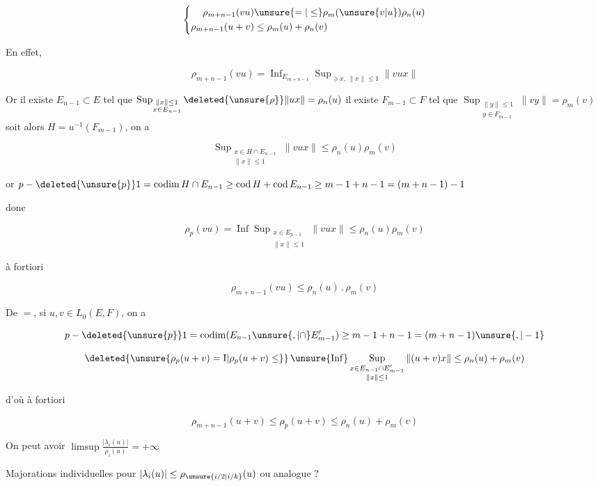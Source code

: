 
\[
\left\{\begin{aligned}
\rho_{m+n-1}(vu)&\unsure{=|\leq}\rho_m(\unsure{v|u})\rho_n(u)\\
\rho_{m+n-1}(u+v)&\leq\rho_m(u)+\rho_n(v)
\end{aligned}\right.
\]

En effet,

\[
\rho_{m+n-1}(vu)=\mathop{\mathrm{Inf}}_{E_{m+n-1}}
\mathop{\mathrm{Sup}}_{\ni x,\,\|x\|\leq1}\|vu x\|
\]


Or il existe $E_{n-1}\subset E$ tel que $\mathop{\mathrm{Sup}}_{\substack{\|x\|\leq1\\x\in E_{n-1}}}\deleted{\unsure{\rho}}\|ux\|=\rho_n(u)$  il existe $F_{m-1}\subset F$ tel que $\mathop{\mathrm{Sup}}_{\substack{\|y\|\leq1\\y\in F_{m-1}}}\|vy\|=\rho_m(v)$ soit alors $H=u^{-1}(F_{m-1})$, on a


\[
\mathop{\mathrm{Sup}}_{\substack{x\in H\cap E_{n-1}\\\|x\|\leq1}}\|vux\|\leq\rho_n(u)\rho_m(v)
\]

or $p-\deleted{\unsure{p}}1=\operatorname{codim}H\cap E_{n-1}\geq\operatorname{cod}H+\operatorname{cod}E_{n-1}\geq m-1+n-1=(m+n-1)-1$

donc

\[
\rho_p(vu)=\mathop{\mathrm{Inf}}\mathop{\mathrm{Sup}}_{\substack{x\in E_{p-1}\\\|x\|\leq1}}\|vux\|\leq\rho_n(u)\rho_m(v)
\]

à fortiori

\[
\boxed{\rho_{m+n-1}(vu)\leq\rho_n(u)\mathbin{.}\rho_m(v)}
\]

De $=$, si $u,v\in L_0(E,F)$, on a

\[
p-\deleted{\unsure{p}}1=\operatorname{codim}(E_{n-1}\unsure{,|\cap} E'_{m-1})\geq m-1+n-1=(m+n-1)\unsure{,|-1}
\]

\[
\deleted{\unsure{\rho_p(u+v)=\mathrm I|\rho_p(u+v)\leq}}
\mathop{\unsure{\mathrm{Inf}}}\mathop{\mathrm{Sup}}_{\substack{x\in E_{n-1}\cap E'_{m-1}\\\|x\|\leq1}}
\|(u+v)x\|\leq\rho_n(u)+\rho_m(v)
\]

d'où à fortiori

\[
\rho_{m+n-1}(u+v)\leq\rho_p(u+v)\leq\rho_n(u)+\rho_m(v)
\]

 On peut avoir $\limsup\frac{|\lambda_i(u)|}{\rho_i(u)}=+\infty$

Majorations individuelles pour $|\lambda_i(u)|\leq\rho_{\unsure{i/2|i/k}}(u)$ ou analogue ?

